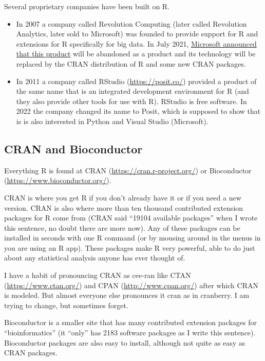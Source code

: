 \documentclass[
]{article}
\begin{document}
Several proprietary companies have been built on R.

\begin{itemize}
\item
  In 2007 a company called Revolution Computing (later called Revolution
  Analytics, later sold to Microsoft) was founded to provide support for
  R and extensions for R specifically for big data. In July 2021,
  \href{https://cloudblogs.microsoft.com/sqlserver/2021/06/30/looking-to-the-future-for-r-in-azure-sql-and-sql-server/}{Microsoft
  announced that this product} will be abandoned as a product and its
  technology will be replaced by the CRAN distribution of R and some new
  CRAN packages.
\item
  In 2011 a company called RStudio (\url{https://posit.co/}) provided a
  product of the same name that is an integrated development environment
  for R (and they also provide other tools for use with R). RStudio is
  free software. In 2022 the company changed its name to Posit, which is
  supposed to show that is is also interested in Python and Visual
  Studio (Microsoft).
\end{itemize}

\hypertarget{cran-and-bioconductor}{%
\subsection{CRAN and Bioconductor}\label{cran-and-bioconductor}}

Everything R is found at CRAN (\url{https://cran.r-project.org/}) or
Bioconductor (\url{https://www.bioconductor.org/}).

CRAN is where you get R if you don't already have it or if you need a
new version. CRAN is also where more than ten thousand contributed
extension packages for R come from (CRAN said ``19104 available
packages'' when I wrote this sentence, no doubt there are more now). Any
of these packages can be installed in seconds with one R command (or by
mousing around in the menus in you are using an R app). These packages
make R very powerful, able to do just about any statistical analysis
anyone has ever thought of.

I have a habit of pronouncing CRAN as cee-ran like CTAN
(\url{https://www.ctan.org/}) and CPAN (\url{http://www.cpan.org/})
after which CRAN is modeled. But almost everyone else pronounces it cran
as in cranberry. I am trying to change, but sometimes forget.

Bioconductor is a smaller site that has many contributed extension
packages for ``bioinformatics'' (it ``only'' has 2183 software packages
as I write this sentence). Bioconductor packages are also easy to
install, although not quite as easy as CRAN packages.
\end{document}
